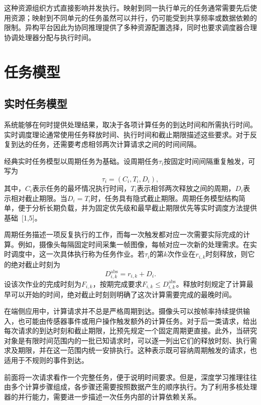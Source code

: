 这种资源组织方式直接影响并发执行。映射到同一执行单元的任务通常需要先后使用资源；映射到不同单元的任务虽然可以并行，仍可能受到共享频率或数据依赖的限制。异构平台因此为协同推理提供了多种资源配置选择，同时也要求调度器合理协调处理器分配与执行时间。

\section{任务模型}

\subsection{实时任务模型}

系统能够在何时提供处理结果，取决于各项计算任务的到达时间和所需执行时间。实时调度理论通常使用任务释放时间、执行时间和截止期限描述这些要求。对于反复到达的任务，还需要考虑相邻两次计算请求之间的时间间隔。

经典实时任务模型以周期任务为基础。设周期任务$\tau_i$按固定时间间隔重复触发，可写为
\begin{equation}\label{eq:ch2-periodic}
  \tau_i=(C_i,T_i,D_i),
\end{equation}
其中，$C_i$表示任务的最坏情况执行时间，$T_i$表示相邻两次释放之间的周期，$D_i$表示相对截止期限。当$D_i=T_i$时，任务具有隐式截止期限。周期任务模型结构简单，便于分析长期负载，并为固定优先级和最早截止期限优先等实时调度方法提供基础~[1,5]。

周期任务描述一项反复执行的工作，而每一次触发都对应一次需要实际完成的计算。例如，摄像头每隔固定时间采集一帧图像，每帧对应一次新的处理需求。在实时调度中，这一次具体执行称为任务作业。若$\tau_i$的第$k$次作业在$r_{i,k}$时刻释放，则它的绝对截止时刻为
\begin{equation}\label{eq:ch2-jobdeadline}
  D_{i,k}^{\mathrm{abs}}=r_{i,k}+D_i.
\end{equation}
设该次作业的完成时刻为$F_{i,k}$，按期完成要求$F_{i,k}\le D_{i,k}^{\mathrm{abs}}$。释放时刻规定了计算最早可以开始的时间，绝对截止时刻则明确了这次计算需要完成的最晚时间。

在端侧应用中，计算请求并不总是严格周期到达。摄像头可以按帧率持续提供输入，也可能由传感器事件或用户操作触发额外的计算任务。对于后一类请求，给出每次请求的到达时刻和截止期限，比预先规定一个固定周期更直接。此外，当研究对象是有限时间范围内的一批已知请求时，可以逐一列出它们的释放时刻、执行需求及期限，并在这一范围内统一安排执行。这种表示既可容纳周期触发的请求，也适用于不规则的事件到达。

前面将一次请求看作一个完整任务，便于说明时间要求。但是，深度学习推理往往由多个计算步骤组成，各步骤还需要按照数据产生的顺序执行。为了利用多核处理器的并行能力，需要进一步描述一次任务内部的计算依赖关系。

